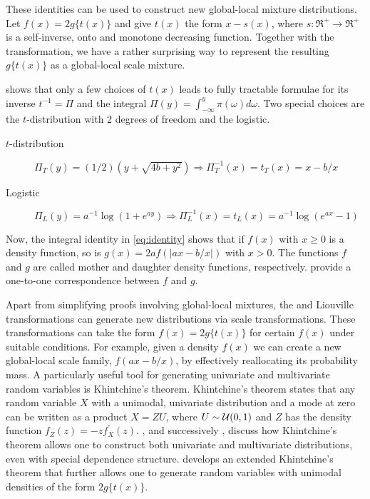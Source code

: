 \documentclass[lineno]{biometrika}
\begin{document}
These identities can be used to construct new global-local mixture distributions. 
Let $f(x) = 2g\{ t(x) \}$ and give $t(x)$ the form $x-s(x)$, where 
$s : \Re^+ \to \Re^+$ is a self-inverse, onto and monotone decreasing function. 
Together with the \CS{} transformation, we have a rather surprising way to
represent the resulting $g\{t(x)\}$ as a global-local scale mixture. 

\citet{jones_generating_2014} shows that only a few choices of $t(x)$ leads to
fully tractable formulae for its inverse $t^{-1}= \Pi$ and the integral 
$\Pi(y) = \int_{-\infty}^{y} \pi(\omega) d\omega$. Two special choices are the
$t$-distribution with 2 degrees of freedom and the logistic. 
\begin{description}
  \item[$t$-distribution] 
    $\Pi_{T}(y) = (1/2)(y+\sqrt{4b+y^2}) \Rightarrow \Pi_T^{-1}(x) = t_T(x) = x - b/x$ 
  \\
  \item[Logistic] 
    $\Pi_{L}(y) = a^{-1} \log(1+e^{ay}) \Rightarrow \Pi_L^{-1}(x) = t_L(x) = a^{-1} \log(e^{ax}-1)$
\end{description}

Now, the integral identity in \eqref{eq:identity} shows that if $f(x)$ with $x
\geq 0$ is a density function, so is $g(x) = 2a f(|ax-b/x|)$ with $x > 0$.  The
functions $f$ and $g$ are called mother and daughter
density functions, respectively.  \citet{chaubey2010reciprocal} provide a
one-to-one correspondence between $f$ and $g$. 

Apart from simplifying proofs involving global-local mixtures, the \CS{} and Liouville
transformations can generate new distributions via scale transformations.  
These transformations can take the form $f(x) = 2 g\{ t(x) \}$ 
for certain $f(x)$ under suitable conditions.  
For example, given a density $f(x)$ we can create a new global-local
scale family, $f(a x - b/x)$, by effectively reallocating its probability mass.
A particularly useful tool for generating univariate and multivariate random
variables is Khintchine's theorem.  
Khintchine's theorem states that any random variable $X$ with a unimodal,
univariate distribution and a mode at zero can be written as a product 
$X = Z U$, where $U \sim \mathcal{U}(0,1)$ and $Z$ has the density function 
$f_Z(z) = -z f^{\prime}_{X}(z)$.
\citet{bryson1982constructing}, and successively \citet{jones2012khintchine},
discuss how Khintchine's theorem allows one to construct both univariate and
multivariate distributions, even with special dependence structure.
\cite{jones_generating_2014} develops an extended Khintchine's theorem that
further allows one to generate random variables with unimodal densities of the
form $2 g\{t(x)\}$. 
\end{document}

